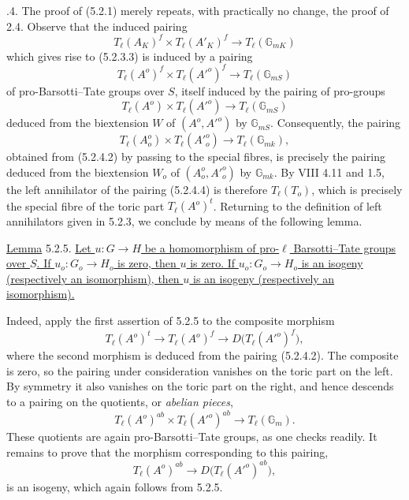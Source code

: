 \smallskip
{}.4. The proof of (5.2.1) merely repeats, with practically no change,
the proof of 2.4.  Observe that the induced pairing
\begin{equation}\tag{5.2.4.1}
 T_\ell(A_K)^f\times T_\ell(A'_K)^f
 \longrightarrow T_\ell(\mathbb G_{mK})
\end{equation}
which gives rise to (5.2.3.3) is induced by a pairing
\begin{equation}\tag{5.2.4.2}
 T_\ell(A^o)^f\times T_\ell({A'}^o)^f
 \longrightarrow T_\ell(\mathbb G_{mS})
\end{equation}
of pro-Barsotti--Tate groups over $S$, itself induced by the pairing
of pro-groups
\begin{equation}\tag{5.2.4.3}
 T_\ell(A^o)\times T_\ell({A'}^o)
 \longrightarrow T_\ell(\mathbb G_{mS})
\end{equation}
deduced from the biextension $W$ of $(A^o,{A'}^o)$ by
$\mathbb G_{mS}$.  Consequently, the pairing
\begin{equation}\tag{5.2.4.4}
 T_\ell(A_o^o)\times T_\ell({A'}_o^o)
 \longrightarrow T_\ell(\mathbb G_{mk}),
\end{equation}
obtained from (5.2.4.2) by passing to the special fibres, is precisely
the pairing deduced from the biextension $W_o$ of
$(A_o^o,{A'}_o^o)$ by $\mathbb G_{mk}$.  By VIII 4.11 and 1.5,
the left annihilator of the pairing (5.2.4.4) is therefore
$T_\ell(T_o)$, which is precisely the special fibre of the toric part
$T_\ell(A^o)^t$.  Returning to the definition of left annihilators
given in 5.2.3, we conclude by means of the following lemma.

\medskip
\noindent
\underline{Lemma} 5.2.5. \underline{Let $u:G\longrightarrow H$ be a
homomorphism of pro-$\ell$ Barsotti--Tate groups over $S$.  If
$u_o:G_o\longrightarrow H_o$ is zero, then $u$ is zero.  If
$u_o:G_o\longrightarrow H_o$ is an isogeny (respectively an
isomorphism), then $u$ is an isogeny (respectively an isomorphism).}

Indeed, apply the first assertion of 5.2.5 to the composite morphism
\[
 T_\ell(A^o)^t
 \longrightarrow T_\ell(A^o)^f
 \longrightarrow D\bigl(T_\ell({A'}^o)^f\bigr),
\]
where the second morphism is deduced from the pairing (5.2.4.2).  The
composite is zero, so the pairing under consideration vanishes on the
toric part on the left.  By symmetry it also vanishes on the toric part
on the right, and hence descends to a pairing on the quotients, or
\emph{abelian pieces},
\[
 T_\ell(A^o)^{ab}\times T_\ell({A'}^o)^{ab}
 \longrightarrow T_\ell(\mathbb G_m).
\]
These quotients are again pro-Barsotti--Tate groups, as one checks
readily.  It remains to prove that the morphism corresponding to this
pairing,
\[
 T_\ell(A^o)^{ab}
 \longrightarrow D\bigl(T_\ell({A'}^o)^{ab}\bigr),
\]
is an isogeny, which again follows from 5.2.5.

